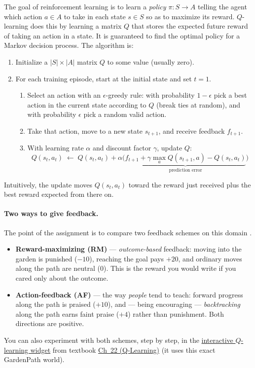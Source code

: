 \documentclass[11pt]{article}
\newcommand{\chql}{\href{https://josephausterweil.github.io/probintro/intro2/22_q_learning/}{Ch~22 (Q-Learning)}}
\newcommand{\qlwidget}{\href{https://josephausterweil.github.io/probintro/widgets/qlearning-gridworld.html}{interactive $Q$-learning widget}}
\begin{document}
\noindent The goal of reinforcement learning is to learn a {\em policy}
$\pi: S \rightarrow A$ telling the agent which action $a \in A$ to take in each
state $s \in S$ so as to maximize its reward. $Q$-learning does this by learning a
matrix $Q$ that stores the expected future reward of taking an action in a state.
It is guaranteed to find the optimal policy for a Markov decision process. The
algorithm is:
\begin{enumerate}
\item[1.] Initialize a $|S| \times |A|$ matrix $Q$ to some value (usually zero).
\item[2.] For each training episode, start at the initial state and set $t=1$.
\begin{enumerate}
\item[2a.] Select an action with an $\epsilon$-greedy rule: with probability
$1-\epsilon$ pick a best action in the current state according to $Q$ (break ties
at random), and with probability $\epsilon$ pick a random valid action.
\item[2b.] Take that action, move to a new state $s_{t+1}$, and receive feedback $f_{t+1}$.
\item[2c.] With learning rate $\alpha$ and discount factor $\gamma$, update $Q$:
\begin{equation}
Q(s_t,a_t) \;\leftarrow\; Q(s_t,a_t) + \alpha \Big(\underbrace{f_{t+1} + \gamma \max_a Q(s_{t+1}, a) - Q(s_t,a_t)}_{\text{prediction error}} \Big)
\label{eq:qlearn}
\end{equation}
\end{enumerate}
\end{enumerate}
Intuitively, the update moves $Q(s_t,a_t)$ toward the reward just received plus the
best reward expected from there on.

\paragraph{Two ways to give feedback.} The point of the assignment is to compare
two feedback schemes on this domain \citep*{ho15}.
\begin{itemize}
\item {\bf Reward-maximizing (RM)} --- {\em outcome-based} feedback: moving into
the garden is punished ($-10$), reaching the goal pays $+20$, and ordinary moves
along the path are neutral ($0$). This is the reward you would write if you cared
only about the outcome.
\item {\bf Action-feedback (AF)} --- the way {\em people} tend to teach: forward
progress along the path is praised ($+10$), and --- being encouraging --- {\em
backtracking} along the path earns faint praise ($+4$) rather than punishment.
Both directions are positive.
\end{itemize}
You can also experiment with both schemes, step by step, in the \qlwidget{} from
textbook \chql{} (it uses this exact GardenPath world).
\end{document}
